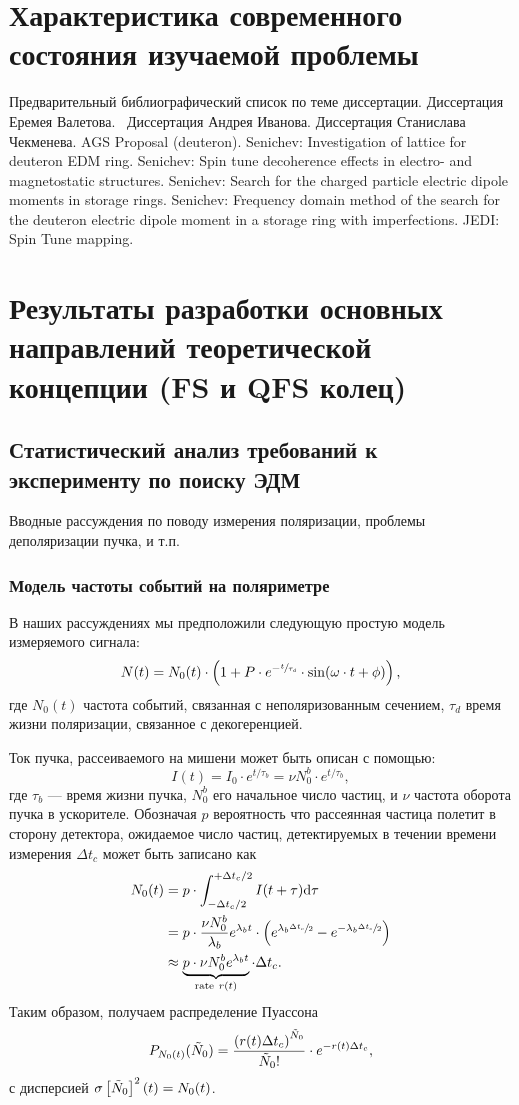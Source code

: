 \documentclass{report}
\newcommand{\td}{\mathrm{d}}
\newcommand{\cnt}{c}
\newcommand{\dt}{\Delta t}
\newcommand{\dtc}{\dt_{\cnt}}
\newcommand{\LTb}{\tau_b}
\newcommand{\LTd}{\tau_d}
\newcommand{\lamb}{\lambda_b}
\begin{document}
\chapter{Характеристика современного состояния изучаемой проблемы}
Предварительный библиографический список по теме диссертации.
Диссертация Еремея Валетова.~\citep[p.~235]{Eremey:Thesis}
Диссертация Андрея Иванова.
Диссертация Станислава Чекменева.
AGS Proposal (deuteron).
Senichev: Investigation of lattice for deuteron EDM ring.
Senichev: Spin tune decoherence effects in electro- and magnetostatic structures.
Senichev: Search for the charged particle electric dipole moments in storage rings.
Senichev: Frequency domain method of the search for the deuteron electric dipole moment in a storage ring with imperfections.
JEDI: Spin Tune mapping.


\chapter{Результаты разработки основных направлений теоретической концепции (FS и QFS колец)}
\section{Статистический анализ требований к эксперименту по поиску
  ЭДМ}

Вводные рассуждения по поводу измерения поляризации, проблемы
деполяризации пучка, и т.п.

\subsection{Модель частоты событий на поляриметре}
В наших рассуждениях мы предположили следующую простую модель
измеряемого сигнала:
\begin{equation}\label{eq:DetCntRt}
	N(t) = N_0(t)\cdot\bkt{1 + P\cdot e^{-\sfrac{t}{\LTd}}\cdot\sin(\omega\cdot t + \phi)},
\end{equation}
где $N_0(t)$ частота событий, связанная с неполяризованным сечением,
$\LTd$ время жизни поляризации, связанное с декогеренцией.

Ток пучка, рассеиваемого на мишени может быть описан с помощью:
\[
I(t)= I_0\cdot e^{t/\LTb} = \nu N_0^b\cdot e^{t/\LTb},
\]
где $\LTb$ --- время жизни пучка, $N_0^b$ его начальное число частиц,
и $\nu$ частота оборота пучка в ускорителе. Обозначая $p$ вероятность
что рассеянная частица полетит в сторону детектора, ожидаемое число
частиц, детектируемых в течении времени измерения $\dtc$ может быть
записано как
\begin{align}
N_0(t) & = p\cdot\int_{-\dtc/2}^{+\dtc/2} I(t+\tau)\td\tau \notag                    \\
& = p\cdot\frac{\nu N_0^b}{\lamb} e^{\lamb t}\cdot \bkt{e^{\lamb\sfrac{\dtc}{2}} - e^{-\lamb\sfrac{\dtc}{2}}} \notag \\
& \approx \underbrace{p\cdot\nu N_0^b e^{\lamb t}}_{\text{rate}~r(t)} \cdot\dtc.
\end{align}
Таким образом, получаем распределение Пуассона
\[
	P_{N_0(t)}(\tilde{N}_0) = \frac{\bkt{r(t)\dtc}^{\tilde{N}_0}}{\tilde{N}_0!}\cdot e^{-r(t)\dtc},
\]
с дисперсией $\SD{\tilde{N}_0}^2(t) = N_0(t)$. %
\end{document}
